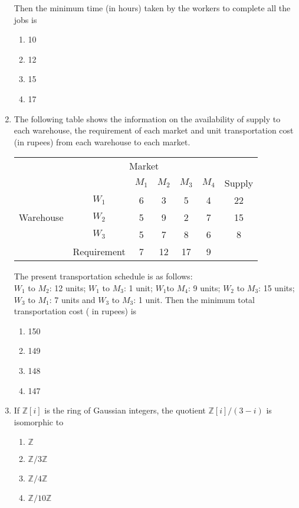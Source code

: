 \documentclass[journal,12pt,onecolumn]{IEEEtran}
\theoremstyle{remark}
\begin{document}
\begin{enumerate}[start=27]
Then the minimum time (in hours) taken by the workers to complete all the jobs is
\begin{enumerate}
    \item 10
    \item 12
    \item 15
    \item 17
\end{enumerate}
\item The following table shows the information on the availability of supply to each warehouse, the requirement of each market and unit transportation cost (in rupees) from each warehouse to each market.
\begin{table}[h!]
    \centering
    \begin{tabular}{c ccccc c}
        & \multicolumn{5}{c}{Market} & \\
        & & $M_1$ & $M_2$ & $M_3$ & $M_4$ & Supply \\
        & $W_1$ & 6 & 3 & 5 & 4 & 22 \\
        Warehouse & $W_2$ & 5 & 9 & 2 & 7 & 15 \\
        & $W_3$ & 5 & 7 & 8 & 6 & 8 \\
        & Requirement & 7 & 12 & 17 & 9 & \\ %
    \end{tabular}
\end{table}

The present transportation schedule is as follows: \\
$W_1$ to $M_2$: 12 units; $W_1$ to $M_3$: 1 unit; $W_1$to $M_4$: 9 units; $W_2$ to $M_3$: 15 units; $W_3$ to $M_1$: 7 units and $W_3$ to $M_3$: 1 unit. Then the minimum total transportation cost ( in rupees) is 
\begin{enumerate}
    \item 150
    \item 149
    \item 148
    \item 147
\end{enumerate}
\item If $\mathbb{Z}[i]$ is the ring of Gaussian integers, the quotient $\mathbb{Z}[i]/(3-i)$ is isomorphic to
\begin{enumerate}
    \item $\mathbb{Z}$
    \item $\mathbb{Z}/3\mathbb{Z}$
    \item $\mathbb{Z}/4\mathbb{Z}$
    \item $\mathbb{Z}/10\mathbb{Z}$
\end{enumerate}
\end{enumerate}
\end{document}
